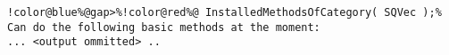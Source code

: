 \begin{Verbatim}[commandchars=!@\%,frame=single]
!color@blue%@gap>%!color@red%@ InstalledMethodsOfCategory( SQVec );%
Can do the following basic methods at the moment:
... <output ommitted> ..
\end{Verbatim}
